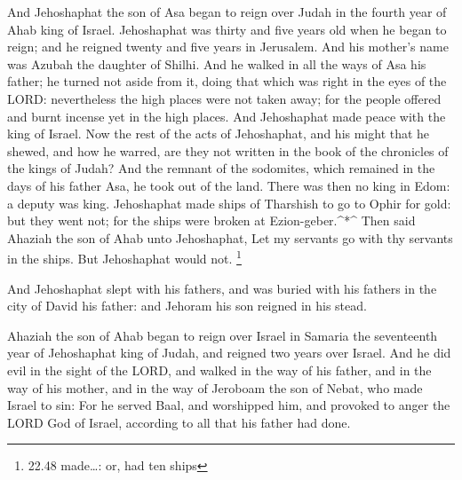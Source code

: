  And Jehoshaphat the son of Asa began to reign over Judah
in the fourth year of Ahab king of Israel.  Jehoshaphat was
thirty and five years old when he began to reign; and he reigned twenty
and five years in Jerusalem. And his mother's name was Azubah the
daughter of Shilhi.  And he walked in all the ways of Asa
his father; he turned not aside from it, doing that which was right in
the eyes of the LORD: nevertheless the high places were not taken away;
for the people offered and burnt incense yet in the high places.
 And Jehoshaphat made peace with the king of Israel.
 Now the rest of the acts of Jehoshaphat, and his might
that he shewed, and how he warred, are they not written in the book of
the chronicles of the kings of Judah?  And the remnant of
the sodomites, which remained in the days of his father Asa, he took out
of the land.  There was then no king in Edom: a deputy was
king.  Jehoshaphat made ships of Tharshish to go to Ophir
for gold: but they went not; for the ships were broken at
Ezion-geber.\^{}*\^{}  Then said Ahaziah the son of Ahab
unto Jehoshaphat, Let my servants go with thy servants in the ships. But
Jehoshaphat would not. \footnote{22.48 made\ldots: or, had ten ships}

 And Jehoshaphat slept with his fathers, and was buried
with his fathers in the city of David his father: and Jehoram his son
reigned in his stead.

 Ahaziah the son of Ahab began to reign over Israel in
Samaria the seventeenth year of Jehoshaphat king of Judah, and reigned
two years over Israel.  And he did evil in the sight of the
LORD, and walked in the way of his father, and in the way of his mother,
and in the way of Jeroboam the son of Nebat, who made Israel to sin:
 For he served Baal, and worshipped him, and provoked to
anger the LORD God of Israel, according to all that his father had done.
